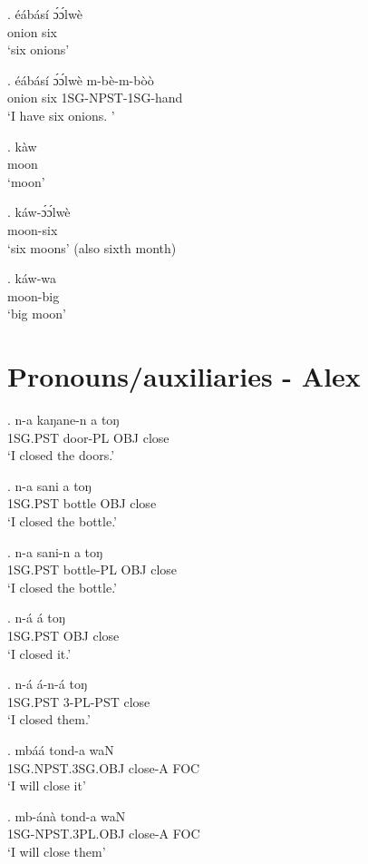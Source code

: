 \documentclass{assets/fieldnotes}
\begin{document}
\exg. éábásí ɔ́ɔ́lwè\\
onion six \\
`six onions'

\exg. éábásí ɔ́ɔ́lwè m-bè-m-bòò \\
onion six 1SG-NPST-1SG-hand \\
`I have six onions. '

\exg. kàw \\
moon\\
`moon'

\exg. káw-ɔ́ɔ́lwè\\
moon-six\\
`six moons' (also sixth month)

\exg. káw-wa \\
moon-big \\
`big moon'

\section{Pronouns/auxiliaries - Alex}


\exg.
n-a    kaŋane-n   a     toŋ   \\
1SG.PST  door-PL    OBJ   close \\%
`I closed the doors.'

\exg.
n-a    sani     a     toŋ   \\
1SG.PST  bottle   OBJ   close \\%
`I closed the bottle.'

\exg.
n-a    sani-n      a     toŋ   \\
1SG.PST bottle-PL   OBJ   close \\%
`I closed the bottle.'

\exg.
n-á   á   toŋ \\
1SG.PST OBJ close \\%
`I closed it.'

\exg.
n-á    á-n-á       toŋ   \\
1SG.PST 3-PL-PST   close \\%
`I closed them.'

\exg.
mbáá              tond-a    waN \\
1SG.NPST.3SG.OBJ   close-A   FOC \\%
`I will close it'

\exg.
mb-ánà            tond-a    waN \\
1SG-NPST.3PL.OBJ   close-A   FOC \\%
`I will close them'

\end{document}
